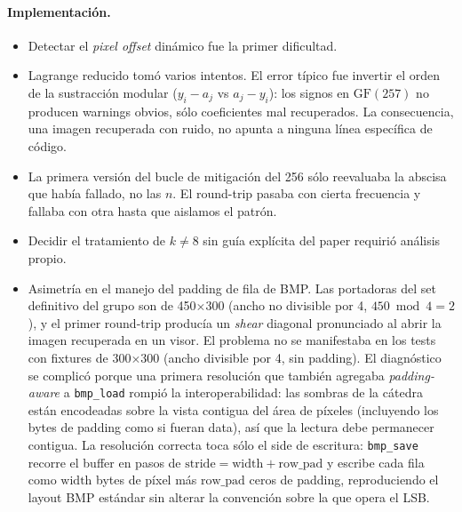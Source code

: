 \documentclass[11pt,a4paper]{article}
\begin{document}
\paragraph{Implementación.}
\begin{itemize}[leftmargin=*,nosep]
    \item Detectar el \emph{pixel offset} dinámico fue la primer dificultad.
    \item Lagrange reducido tomó varios intentos. El error típico fue
          invertir el orden de la sustracción modular ($y_i - a_j$ vs
          $a_j - y_i$): los signos en $\mathrm{GF}(257)$ no producen
          warnings obvios, sólo coeficientes mal recuperados. La
          consecuencia, una imagen recuperada con ruido, no apunta a
          ninguna línea específica de código.
    \item La primera versión del bucle de mitigación del 256 sólo
          reevaluaba la abscisa que había fallado, no las $n$. El
          round-trip pasaba con cierta frecuencia y fallaba con otra
          hasta que aislamos el patrón.
    \item Decidir el tratamiento de $k \neq 8$ sin guía explícita del
          paper requirió análisis propio.
    \item Asimetría en el manejo del padding de fila de BMP. Las
          portadoras del set definitivo del grupo son de
          450$\times$300 (ancho no divisible por 4, $450 \bmod 4 = 2$),
          y el primer round-trip producía un \emph{shear} diagonal
          pronunciado al abrir la imagen recuperada en un visor.
          El problema no se manifestaba en los tests con fixtures de
          300$\times$300 (ancho divisible por 4, sin padding). El
          diagnóstico se complicó porque una primera resolución que
          también agregaba \emph{padding-aware} a \texttt{bmp\_load}
          rompió la interoperabilidad: las sombras de la cátedra están
          encodeadas sobre la vista contigua del área de píxeles
          (incluyendo los bytes de padding como si fueran data), así
          que la lectura debe permanecer contigua. La resolución
          correcta toca sólo el side de escritura: \texttt{bmp\_save}
          recorre el buffer en pasos de
          $\text{stride} = \text{width} + \text{row\_pad}$ y escribe
          cada fila como $\text{width}$ bytes de píxel más
          $\text{row\_pad}$ ceros de padding, reproduciendo el layout
          BMP estándar sin alterar la convención sobre la que opera
          el LSB.
\end{itemize}
\end{document}
